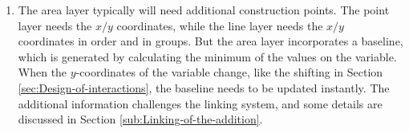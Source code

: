 \documentclass[12pt]{article}
\providecommand{\tabularnewline}{\\}
\begin{document}
\begin{enumerate}
\item The area layer typically will need additional construction points. The point layer needs the $x/y$ coordinates, while the line layer needs the $x/y$ coordinates in order and in groups. But the area layer incorporates a baseline, which is generated by calculating the minimum of the values on the variable. When the $y$-coordinates of the variable change, like the shifting in Section \ref{sec:Design-of-interactions}, the baseline needs to be updated instantly. The additional information challenges the linking system, and some details are discussed in Section \ref{sub:Linking-of-the-addition}.


\end{enumerate}
\end{document}

